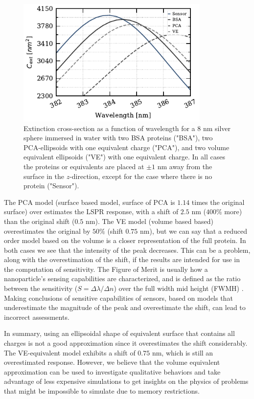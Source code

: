 \begin{figure} %
    \centering
    \includegraphics[width=0.85\textwidth]{two_ell_analysis.pdf} 
    \caption{Extinction cross-section as a function of wavelength for a 8 nm silver sphere immersed 
    in water with two BSA proteins ("BSA"), two PCA-ellipsoids with one equivalent charge ("PCA"), and two
    volume equivalent ellipsoids ("VE") with one equivalent charge. In all cases the proteins or equivalents
    are placed at $\pm 1$ nm away from the surface in the $z$-direction, except for the case where there is 
    no protein ("Sensor").}
    \label{fig:2pz_ell_resp}
 \end{figure}

The PCA model (surface based model, surface of PCA is $1.14$ times the original surface) over estimates the LSPR response, 
with a shift of $2.5$ nm ($400\%$ more) than the original shift ($0.5$ nm). The VE model (volume based based)  
overestimates the original by $50\%$ (shift $0.75$ nm), but we can say that a reduced order model based on the volume 
is a closer representation of the full protein. In both cases we see that the intensity of the peak decreases. This can be 
a problem, along with the overestimation of the shift, if the results are intended for use in the computation of sensitivity. The Figure of
Merit is usually how a nanoparticle's sensing capabilities are characterized, and is defined as the ratio between the 
sensitivity ($S = \Delta \lambda / \Delta n$) over the full width mid height (FWMH) \cite{otte2012}. Making 
conclusions of sensitive capabilities of sensors, based on models that underestimate the magnitude of the peak and 
overestimate the shift, can lead to incorrect assessments.

In summary, using an ellipsoidal shape of equivalent surface that contains all charges is not a good approximation
since it overestimates the shift considerably. The VE-equivalent model exhibits a shift of $0.75$ nm, which is still  
an overestimated response. However, we believe that the volume equivalent approximation can be used to investigate 
qualitative behaviors and take advantage of less expensive simulations to get insights on the physics of problems 
that might be impossible to simulate due to memory restrictions.

